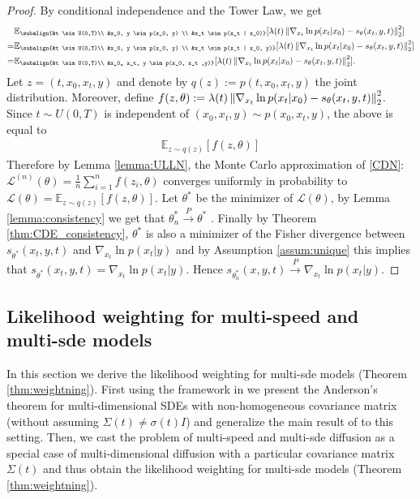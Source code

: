 \begin{proof}
    By conditional independence and the Tower Law, we get
    \begin{align*}
         &\mathbb{E}_{\subalign{&t \sim U(0,T)\\ &x_0, y \sim p(x_0, y) \\ &x_t \sim p(x_t | x_0)}} 
                [\lambda(t) \norm{\nabla_{x_t} \ln{p(x_t | x_0)} - s_\theta(x_t, y, t)}_2^2] \\
        =& \mathbb{E}_{\subalign{&t \sim U(0,T)\\ &x_0, y \sim p(x_0, y) \\ &x_t \sim p(x_t | x_0, y)}} 
            [\lambda(t) \norm{\nabla_{x_t} \ln{p(x_t | x_0)} - s_\theta(x_t, y, t)}_2^2] \\
        =& \mathbb{E}_{\subalign{&t \sim U(0,T)\\ &x_0,, x_t, y \sim p(x_0, x_t ,y)}} 
            [\lambda(t) \norm{\nabla_{x_t} \ln{p(x_t | x_0)} - s_\theta(x_t, y, t)}_2^2].
    \end{align*}
    Let $z=(t,x_0,x_t,y)$ and denote by $q(z):=p(t,x_0,x_t,y)$ the joint distribution. Moreover, define $f(z,\theta) := \lambda(t) \left\lVert \nabla_{x_t} \ln{p(x_t | x_0)} - s_\theta(x_t, y, t) \right\rVert_2^2$. Since $t \sim U(0,T)$ is independent of $(x_0, x_t ,y) \sim p(x_0, x_t ,y)$, the above is equal to 
    \begin{align*}
        \mathbb{E}_{z \sim q(z)} 
            [f(z,\theta)]
    \end{align*}
    Therefore by Lemma \ref{lemma:ULLN}, the Monte Carlo approximation of \ref{CDN}: $\mathcal{L}^{(n)}(\theta)=\frac{1}{n}\sum_{i=1}^n f(z_i, \theta)$ converges uniformly in probability to $\mathcal{L}(\theta) = \mathbb{E}_{z \sim q(z)} 
    [f(z,\theta)]$. Let $\theta^\ast$ be the minimizer of $\mathcal{L}(\theta)$, by Lemma \ref{lemma:consistency} we get that $\theta^\ast_n \overset{P}{\to} \theta^\ast$ . Finally by Theorem \ref{thm:CDE_consistency}, $\theta^\ast$ is also a minimizer of the Fisher divergence between $s_{\theta^\ast}(x_t,y,t)$ and $\nabla_{x_t} \ln p(x_t | y)$ and by Assumption \ref{assum:unique} this implies that $s_{\theta^\ast}(x_t,y,t) = \nabla_{x_t} \ln p(x_t | y)$. Hence $s_{\theta_n^\ast}(x,y,t) \overset{P}{\to} \nabla_{x_t} \ln p(x_t | y)$.
\end{proof}

\subsection{Likelihood weighting for multi-speed and multi-sde models}
\label{appendix:weighting}
In this section we derive the likelihood weighting for multi-sde models (Theorem \ref{thm:weightning}). First using the framework in \cite[Appendix A]{song2021sde} we present the Anderson's theorem for multi-dimensional SDEs with non-homogeneous covariance matrix (without assuming $\Sigma(t) \not = \sigma(t) I$) and generalize the main result of \cite{song2021maximum} to this setting. Then, we cast the problem of multi-speed and  multi-sde diffusion as a special case of multi-dimensional diffusion with a particular covariance matrix $\Sigma(t)$ and thus obtain the likelihood weighting for multi-sde models (Theorem \ref{thm:weightning}).

